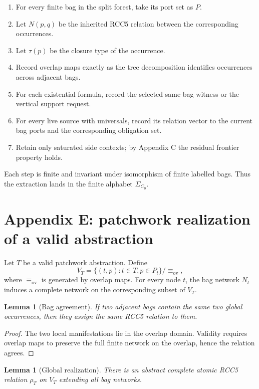 \documentclass[11pt]{article}
\newtheorem{lemma}[theorem]{Lemma}
\newcommand{\eqc}{\equiv_{\mathrm{ov}}}
\begin{document}
\begin{enumerate}[label=(E\arabic*)]
\item For every finite bag in the split forest, take its port set as $P$.
\item Let $N(p,q)$ be the inherited RCC5 relation between the corresponding occurrences.
\item Let $\tau(p)$ be the closure type of the occurrence.
\item Record overlap maps exactly as the tree decomposition identifies occurrences across adjacent bags.
\item For each existential formula, record the selected same-bag witness or the vertical support request.
\item For every live source with universals, record its relation vector to the current bag ports and the corresponding obligation set.
\item Retain only saturated side contexts; by Appendix C the residual frontier property holds.
\end{enumerate}

Each step is finite and invariant under isomorphism of finite labelled bags.  Thus the extraction lands in the finite alphabet $\Sigma_{C_0}$.

\section{Appendix E: patchwork realization of a valid abstraction}

Let $T$ be a valid patchwork abstraction.  Define
\[
V_T=\{(t,p):t\in T, p\in P_t\}/\eqc,
\]
where $\eqc$ is generated by overlap maps.  For every node $t$, the bag network $N_t$ induces a complete network on the corresponding subset of $V_T$.

\begin{lemma}[Bag agreement]
If two adjacent bags contain the same two global occurrences, then they assign the same RCC5 relation to them.
\end{lemma}

\begin{proof}
The two local manifestations lie in the overlap domain.  Validity requires overlap maps to preserve the full finite network on the overlap, hence the relation agrees.
\end{proof}

\begin{lemma}[Global realization]
There is an abstract complete atomic RCC5 relation $\rho_T$ on $V_T$ extending all bag networks.
\end{lemma}
\end{document}
